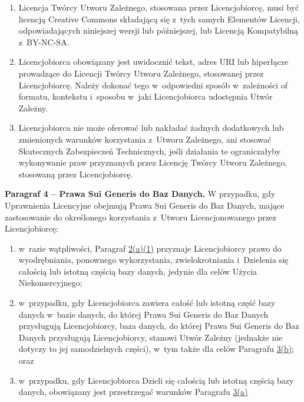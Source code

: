 \documentclass[oneside,polish,11pt,rmheadings]{mwbk}
\begin{document}
\begin{enumerate}
	\begin{enumerate}
\item  Licencja Twórcy Utworu Zależnego, stosowana przez Licencjobiorcę, musi być licencją Creative Commons składającą się z~tych samych Elementów Licencji, odpowiadających niniejszej wersji lub późniejszej, lub Licencją Kompatybilną z~BY-NC-SA.  
\item  Licencjobiorca obowiązany jest uwidocznić tekst, adres URI lub hiperłącze prowadzące do Licencji Twórcy Utworu Zależnego, stosowanej przez Licencjobiorcę. Należy dokonać tego w~odpowiedni sposób w~zależności of formatu, kontekstu i~sposobu w~jaki Licencjobiorca udostępnia Utwór Zależny. 
\item  Licencjobiorca nie może oferować lub nakładać żadnych dodatkowych lub zmienionych warunków korzystania z~Utworu Zależnego, ani stosować Skutecznych Zabezpieczeń Technicznych, jeśli działania te ograniczałyby wykonywanie praw przyznanych przez Licencję Twórcy Utworu Zależnego, stosowaną przez Licencjobiorcę.  			\end{enumerate} 
\end{enumerate}


\textbf{Paragraf 4 – Prawa Sui Generis do Baz Danych.} 
W przypadku, gdy Uprawnienia Licencyjne obejmują Prawa Sui Generis do Baz Danych, mające zastosowanie do określonego korzystania z~Utworu Licencjonowanego przez Licencjobiorcę: 
\begin{enumerate}
\item  w~razie wątpliwości, Paragraf \href{about:reader?url=https%3A%2F%2Fcreativecommons.org%2Flicenses%2Fby-nc-sa%2F4.0%2Flegalcode.pl#s2a1}{2(a)(1)} 
przyznaje Licencjobiorcy prawo do wyodrębniania, ponownego wykorzystania, zwielokrotniania i~Dzielenia się całością lub istotną częścią bazy danych, jedynie dla celów Użycia Niekomercyjnego;  
\item  w~przypadku, gdy Licencjobiorca zawiera całość lub istotną część bazy danych w~bazie danych, do której Prawa Sui Generis do Baz Danych przysługują Licencjobiorcy, baza danych, do której Prawa Sui Generis do Baz Danych przysługują Licencjobiorcy, stanowi Utwór Zależny (jednakże nie dotyczy to jej samodzielnych części), w~tym także dla celów Paragrafu \href{about:reader?url=https%3A%2F%2Fcreativecommons.org%2Flicenses%2Fby-nc-sa%2F4.0%2Flegalcode.pl#s3b}{3(b)}; 
oraz  
\item  w~przypadku, gdy Licencjobiorca Dzieli się całością lub istotną częścią bazy danych, obowiązany jest przestrzegać warunków Paragrafu \href{about:reader?url=https%3A%2F%2Fcreativecommons.org%2Flicenses%2Fby-nc-sa%2F4.0%2Flegalcode.pl#s3a}{3(a)}  
\end{enumerate}
\end{document}
